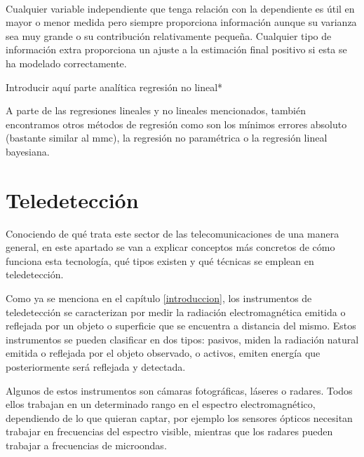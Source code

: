 \\
\par Cualquier variable independiente que tenga relación con la dependiente es útil en mayor o menor medida pero siempre proporciona información aunque su varianza sea muy grande o su contribución relativamente pequeña. Cualquier tipo de información extra proporciona un ajuste a la estimación final positivo si esta se ha modelado correctamente. 
\\
\par *Introducir aquí parte analítica regresión no lineal*
\\
\par A parte de las regresiones lineales y no lineales mencionados, también encontramos otros métodos de regresión como son los mínimos errores absoluto (bastante similar al \gls{mmc}), la regresión no paramétrica o la regresión lineal bayesiana.
\section{Teledetección}
\par Conociendo de qué trata este sector de las telecomunicaciones de una manera general, en este apartado se van a explicar conceptos más concretos de cómo funciona esta tecnología, qué tipos existen y qué técnicas se emplean en teledetección. 
\\
\par Como ya se menciona en el capítulo \ref{introduccion}, los instrumentos de teledetección se caracterizan por medir la radiación electromagnética emitida o reflejada por un objeto o superficie que se encuentra a distancia del mismo. Estos instrumentos se pueden clasificar en dos tipos: pasivos, miden la radiación natural emitida o reflejada por el objeto observado, o activos, emiten energía que posteriormente será reflejada y detectada.
\\
\par Algunos de estos instrumentos son cámaras fotográficas, láseres o radares. Todos ellos trabajan en un determinado rango en el espectro electromagnético, dependiendo de lo que quieran captar, por ejemplo los sensores ópticos necesitan trabajar en frecuencias del espectro visible, mientras que los radares pueden trabajar a frecuencias de microondas.

